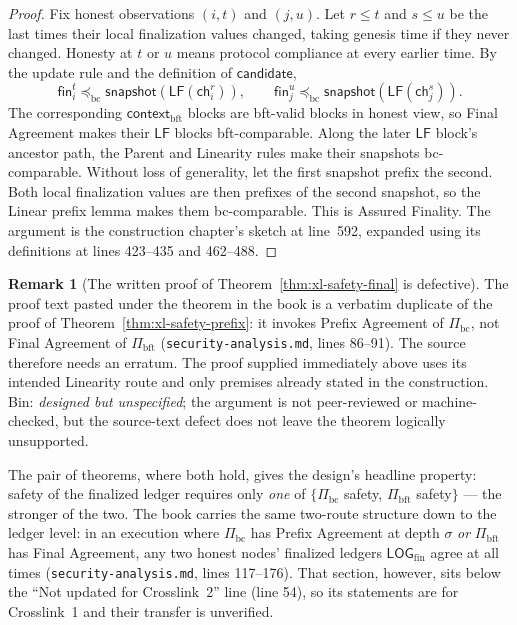 \documentclass[11pt,a4paper]{article}
\theoremstyle{definition}
\newtheorem{remark}[theorem]{Remark}
\begin{document}
\begin{proof}
Fix honest observations $(i,t)$ and $(j,u)$. Let
$r \leq t$ and $s \leq u$ be the last times their local finalization
values changed, taking genesis time if they never changed. Honesty at
$t$ or $u$ means protocol compliance at every earlier time. By the update
rule and the definition of $\mathsf{candidate}$,
\[
\mathsf{fin}_i^t \preceq_{\mathrm{bc}}
  \mathsf{snapshot}(\mathsf{LF}(\mathsf{ch}_i^r)),
\qquad
\mathsf{fin}_j^u \preceq_{\mathrm{bc}}
  \mathsf{snapshot}(\mathsf{LF}(\mathsf{ch}_j^s)).
\]
The corresponding $\mathsf{context}_{\mathrm{bft}}$ blocks are bft-valid
blocks in honest view, so Final Agreement makes their $\mathsf{LF}$ blocks
bft-comparable. Along the later $\mathsf{LF}$ block's ancestor path, the
Parent and Linearity rules make their snapshots bc-comparable.
Without loss of generality, let the first snapshot prefix the second.
Both local finalization values are then prefixes of the second snapshot,
so the Linear prefix lemma makes them bc-comparable. This is Assured
Finality. The argument is the construction chapter's sketch at line~592,
expanded using its definitions at lines 423--435 and 462--488.
\end{proof}

\begin{remark}[The written proof of Theorem~\ref{thm:xl-safety-final} is
defective]\label{rem:xl-final-agreement-proof}
The proof text pasted under the theorem in the book is a verbatim
duplicate of the proof of Theorem~\ref{thm:xl-safety-prefix}: it invokes
Prefix Agreement of $\Pi_{\mathrm{bc}}$, not Final Agreement of
$\Pi_{\mathrm{bft}}$ (\texttt{security-analysis.md}, lines 86--91). The
source therefore needs an erratum. The proof supplied immediately above
uses its intended Linearity route and only premises already stated in the
construction. Bin: \emph{designed but unspecified}; the argument is not
peer-reviewed or machine-checked, but the source-text defect does not leave
the theorem logically unsupported.
\end{remark}

The pair of theorems, where both hold, gives the design's headline
property: safety of the finalized ledger requires only \emph{one} of
$\{\Pi_{\mathrm{bc}}$ safety, $\Pi_{\mathrm{bft}}$ safety$\}$ --- the
stronger of the two. The book carries the same two-route structure down to
the ledger level: in an execution where $\Pi_{\mathrm{bc}}$ has Prefix
Agreement at depth $\sigma$ \emph{or} $\Pi_{\mathrm{bft}}$ has Final
Agreement, any two honest nodes' finalized ledgers
$\mathsf{LOG}_{\mathrm{fin}}$ agree at all times
(\texttt{security-analysis.md}, lines 117--176). That section, however,
sits below the ``Not updated for Crosslink~2'' line (line 54), so its
statements are for Crosslink~1 and their transfer is unverified.
\end{document}
